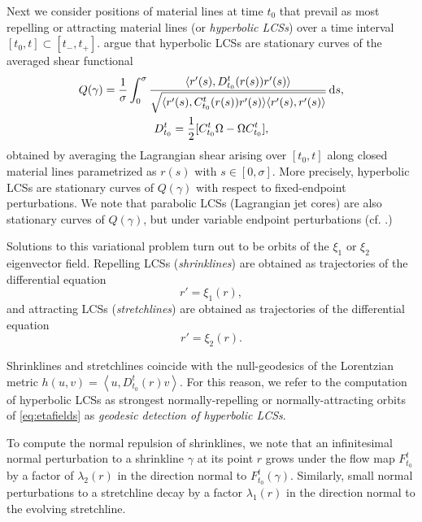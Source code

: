\documentclass{article}
\begin{document}
Next we consider positions of material lines at time $t_0$ that prevail as most repelling or attracting material lines (or \emph{hyperbolic LCSs}) over a time interval $[t_0,t] \subset [t_-,t_+]$. \textcite{farazmand14:_shearless} argue that hyperbolic LCSs are stationary curves of the averaged shear functional
\begin{gather*}
Q(\gamma) = \frac{1}{\sigma} \int_0^\sigma \frac{\langle r'(s),D_{t_0}^t(r(s)) r'(s)\rangle}{\sqrt{\langle r'(s),C_{t_0}^t(r(s)) r'(s)\rangle\langle r'(s),r'(s)\rangle}}\dif s,\\
D_{t_0}^t = \frac12 [C_{t_0}^t \Omega - \Omega C_{t_0}^t],
\end{gather*}
obtained by averaging the Lagrangian shear arising over $[t_0,t]$ along closed material lines parametrized as $r(s)$ with $s \in [0,\sigma]$. More precisely, hyperbolic LCSs are stationary curves of $Q(\gamma)$ with respect to fixed-endpoint perturbations. We note that parabolic LCSs (Lagrangian jet cores) are also stationary curves of $Q(\gamma)$, but under variable endpoint perturbations (cf. \textcite{farazmand14:_shearless}.)

Solutions to this variational problem turn out to be orbits of the $\xi_1$ or $\xi_2$ eigenvector field. Repelling LCSs (\emph{shrinklines}) are obtained as trajectories of the differential equation
\begin{equation}
r' = \xi_1(r),
\label{eq:strainline}
\end{equation}
and attracting LCSs (\emph{stretchlines}) are obtained as trajectories of the differential equation
\begin{equation}
r' = \xi_2(r).
\label{eq:stretchline}
\end{equation}

Shrinklines and stretchlines coincide with the null-geodesics of the Lorentzian metric $h(u,v) = \left\langle u,D_{t_0}^t(r) v \right\rangle$. For this reason, we refer to the computation of hyperbolic LCSs as strongest normally-repelling or normally-attracting orbits of \cref{eq:etafields} as \emph{geodesic detection of hyperbolic LCSs}.

To compute the normal repulsion of shrinklines, we note that an infinitesimal
normal perturbation to a shrinkline $\gamma$ at its point $r$ grows under the flow map $F_{t_{0}}^{t}$ by a factor of $\lambda_{2}(r)$ in the direction normal to $F_{t_{0}}^{t}(\gamma)$. Similarly, small normal perturbations to a stretchline decay by a factor $\lambda_{1}(r)$ in the direction normal to the evolving stretchline. 
\end{document}
